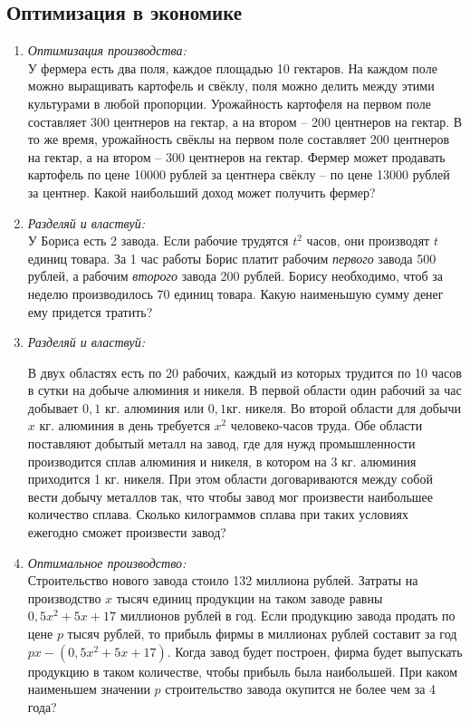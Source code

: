 \documentclass[12pt]{article}
\begin{document}
\subsection{Оптимизация в экономике}
\begin{enumerate}[start=1,label={\itshape\bfseries \arabic*.}]
    \item \emph{Оптимизация производства:}\\
    У фермера есть два поля, каждое площадью 10 гектаров. На каждом поле можно выращивать картофель и свёклу, поля можно делить между этими культурами в любой пропорции. Урожайность картофеля на первом поле составляет 300 центнеров на гектар, а на втором -- 200 центнеров на гектар. В то же время, урожайность свёклы на первом поле составляет 200 центнеров на гектар, а на втором -- 300 центнеров на гектар.  Фермер может продавать картофель по цене 10000 рублей за центнера свёклу -- по цене 13000 рублей за центнер. Какой наибольший доход может получить фермер?
    \item \emph{Разделяй и властвуй:}\\
    У Бориса есть 2 завода. Если рабочие трудятся $t^2$ часов, они производят $t$ единиц товара. За 1 час работы Борис платит рабочим \emph{первого} завода 500 рублей, а рабочим \emph{второго} завода 200 рублей. Борису необходимо, чтоб за неделю производилось 70 единиц товара. Какую наименьшую сумму денег ему придется тратить?
    \item \emph{Разделяй и властвуй:}

    В двух областях есть по 20 рабочих, каждый из которых трудится по 10 часов в сутки на добыче алюминия и никеля.  В первой области один рабочий за час добывает $0,1$ кг. алюминия или $0,1 $кг. никеля. Во второй области для добычи $x$ кг. алюминия в день требуется $x^2$ человеко-часов труда. Обе области поставляют добытый металл на завод, где для нужд промышленности производится сплав алюминия и никеля, в котором на 3 кг. алюминия приходится 1 кг. никеля. При этом области договариваются между собой вести добычу металлов так, что чтобы завод мог произвести наибольшее количество сплава. Сколько килограммов сплава при таких условиях ежегодно сможет произвести завод?
    \item \emph{Оптимальное производство:}\\
    Строительство нового завода стоило 132 миллиона рублей. Затраты на производство $x$ тысяч единиц продукции на таком заводе равны $0,5 x^2 + 5x + 17$ миллионов рублей в год. Если продукцию завода продать по цене $p$ тысяч рублей, то прибыль фирмы в миллионах рублей составит за год $px - (0,5x^2 + 5x + 17)$. Когда завод будет построен, фирма будет выпускать продукцию в таком количестве, чтобы прибыль была наибольшей. При каком наименьшем значении $p$ строительство завода окупится не более чем за 4 года?
    \end{enumerate}
    \newpage
\end{document}
